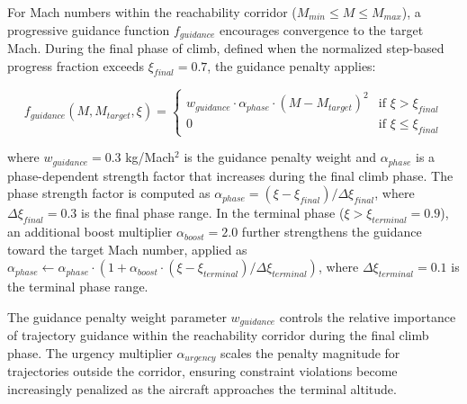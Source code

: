 For Mach numbers within the reachability corridor ($M_{min} \leq M \leq M_{max}$), a progressive guidance function $f_{guidance}$ encourages convergence to the target Mach. During the final phase of climb, defined when the normalized step-based progress fraction exceeds $\xi_{final} = 0.7$, the guidance penalty applies:

\begin{equation}
f_{guidance}(M, M_{target}, \xi) = \begin{cases}
w_{guidance} \cdot \alpha_{phase} \cdot (M - M_{target})^2 & \text{if } \xi > \xi_{final} \\
0 & \text{if } \xi \leq \xi_{final}
\end{cases}
\end{equation}

where $w_{guidance} = 0.3$ kg/Mach$^2$ is the guidance penalty weight and $\alpha_{phase}$ is a phase-dependent strength factor that increases during the final climb phase. The phase strength factor is computed as $\alpha_{phase} = (\xi - \xi_{final}) / \Delta\xi_{final}$, where $\Delta\xi_{final} = 0.3$ is the final phase range. In the terminal phase ($\xi > \xi_{terminal} = 0.9$), an additional boost multiplier $\alpha_{boost} = 2.0$ further strengthens the guidance toward the target Mach number, applied as $\alpha_{phase} \leftarrow \alpha_{phase} \cdot (1 + \alpha_{boost} \cdot (\xi - \xi_{terminal}) / \Delta\xi_{terminal})$, where $\Delta\xi_{terminal} = 0.1$ is the terminal phase range.

The guidance penalty weight parameter $w_{guidance}$ controls the relative importance of trajectory guidance within the reachability corridor during the final climb phase. The urgency multiplier $\alpha_{urgency}$ scales the penalty magnitude for trajectories outside the corridor, ensuring constraint violations become increasingly penalized as the aircraft approaches the terminal altitude.

